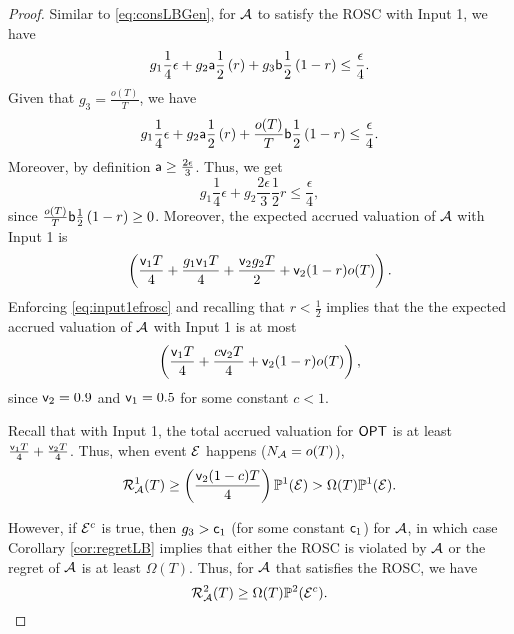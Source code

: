\begin{proof}
Similar to \eqref{eq:consLBGen}, for $\mathcal{A}$ to satisfy the ROSC with Input 1, we have
$$g_1 \frac{1}{4} \epsilon + g_2 {\mathsf{a}} \frac{1}{2} \left(r\right)  + g_3 {\mathsf{b}} \frac{1}{2} \left(1-r\right) \le \frac{\epsilon}{4}.$$
Given that $g_3=\frac{o(T)}{T}$, we have 
$$g_1 \frac{1}{4} \epsilon + g_2 {\mathsf{a}} \frac{1}{2} \left(r\right)  +  \frac{o(T)}{T}{\mathsf{b}} \frac{1}{2} \left(1-r\right) \le \frac{\epsilon}{4}.$$
Moreover, by definition ${\mathsf{a}} \ge \frac{2\epsilon}{3}$. Thus, we get 
\begin{equation}\label{eq:input1efrosc}
g_1 \frac{1}{4} \epsilon + g_2 \frac{2\epsilon}{3} \frac{1}{2} r  \le \frac{\epsilon}{4},
\end{equation}
since 
$\frac{o(T)}{T}{\mathsf{b}} \frac{1}{2} \left(1-r\right)\ge 0$.
Moreover, the expected accrued valuation of $\mathcal{A}$ with Input 1 is 
$$\left(\frac{{\mathsf{v}}_1 T}{4} + \frac{g_1{\mathsf{v}}_1 T}{4} + \frac{{\mathsf{v}}_2 g_2 T}{2} + {\mathsf{v}}_2 (1-r) o(T)\right).$$
Enforcing \eqref{eq:input1efrosc} and recalling that $r< \frac{1}{2}$ implies that the 
the expected accrued valuation of $\mathcal{A}$ with Input 1 is at most
$$\left(\frac{{\mathsf{v}}_1 T}{4} + \frac{c {\mathsf{v}}_2T}{4} + {\mathsf{v}}_2 (1-r) o(T)\right),$$
since ${\mathsf{v}}_2=0.9$ and ${\mathsf{v}}_1=0.5$ for some constant $c<1$.





Recall that with Input 1, the total accrued valuation for $\mathsf{OPT}$ is at least
$\frac{{\mathsf{v}}_1 T}{4} + \frac{{\mathsf{v}}_2 T}{4}$.
Thus, when event $\mathcal{E}$ happens ($N_{\mathcal{A}} = o(T)$),
$$\mathcal{R}_{\mathcal{A}}^1(T) \ge \left(\frac{{\mathsf{v}}_2 (1-c) T}{4} \right) {\mathbb{P}}^1(\mathcal{E}) > \Omega(T){\mathbb{P}}^1(\mathcal{E}).$$



However, if $\mathcal{E}^c$ is true, then $g_3>{\mathsf{c}}_1$ (for some constant ${\mathsf{c}}_1$) for $\mathcal{A}$, in which case Corollary \ref{cor:regretLB} implies that either the ROSC is violated by $\mathcal{A}$ or the 
regret of $\mathcal{A}$ is at least $\Omega(T)$. Thus, for $\mathcal{A}$ that satisfies the ROSC, we have $$\mathcal{R}^2_{\mathcal{A}}(T) \ge \Omega(T) {\mathbb{P}}^2(\mathcal{E}^c).$$


\end{proof}
